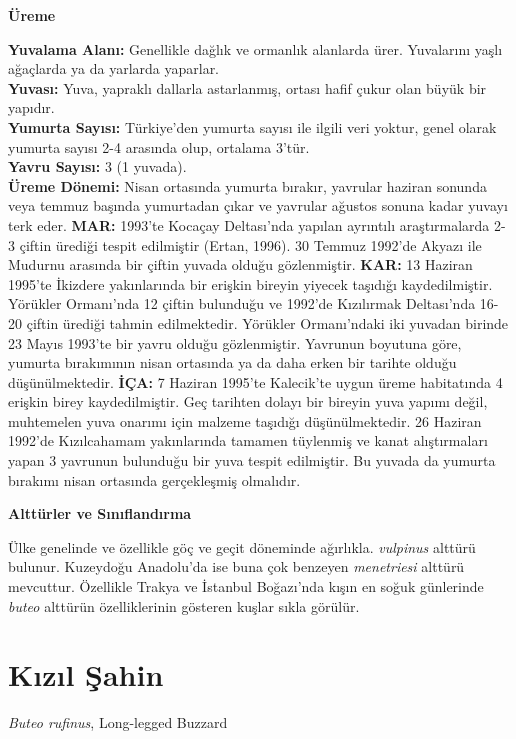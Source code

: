 \documentclass[
  a4paper,
  DIV=11,
  numbers=noendperiod]{scrreprt}
\begin{document}
\textbf{Üreme}

\textbf{Yuvalama Alanı:} Genellikle dağlık ve ormanlık alanlarda ürer.
Yuvalarını yaşlı ağaçlarda ya da yarlarda yaparlar.\\
\textbf{Yuvası:} Yuva, yapraklı dallarla astarlanmış, ortası hafif çukur
olan büyük bir yapıdır.\\
\textbf{Yumurta Sayısı:} Türkiye'den yumurta sayısı ile ilgili veri
yoktur, genel olarak yumurta sayısı 2-4 arasında olup, ortalama 3'tür.\\
\textbf{Yavru Sayısı:} 3 (1 yuvada).\\
\textbf{Üreme Dönemi:} Nisan ortasında yumurta bırakır, yavrular haziran
sonunda veya temmuz başında yumurtadan çıkar ve yavrular ağustos sonuna
kadar yuvayı terk eder. \textbf{MAR:} 1993'te Kocaçay Deltası'nda
yapılan ayrıntılı araştırmalarda 2-3 çiftin ürediği tespit edilmiştir
(Ertan, 1996). 30 Temmuz 1992'de Akyazı ile Mudurnu arasında bir çiftin
yuvada olduğu gözlenmiştir. \textbf{KAR:} 13 Haziran 1995'te İkizdere
yakınlarında bir erişkin bireyin yiyecek taşıdığı kaydedilmiştir.
Yörükler Ormanı'nda 12 çiftin bulunduğu ve 1992'de Kızılırmak
Deltası'nda 16-20 çiftin ürediği tahmin edilmektedir. Yörükler
Ormanı'ndaki iki yuvadan birinde 23 Mayıs 1993'te bir yavru olduğu
gözlenmiştir. Yavrunun boyutuna göre, yumurta bırakımının nisan
ortasında ya da daha erken bir tarihte olduğu düşünülmektedir.
\textbf{İÇA:} 7 Haziran 1995'te Kalecik'te uygun üreme habitatında 4
erişkin birey kaydedilmiştir. Geç tarihten dolayı bir bireyin yuva
yapımı değil, muhtemelen yuva onarımı için malzeme taşıdığı
düşünülmektedir. 26 Haziran 1992'de Kızılcahamam yakınlarında tamamen
tüylenmiş ve kanat alıştırmaları yapan 3 yavrunun bulunduğu bir yuva
tespit edilmiştir. Bu yuvada da yumurta bırakımı nisan ortasında
gerçekleşmiş olmalıdır.

\textbf{Alttürler ve Sınıflandırma}

Ülke genelinde ve özellikle göç ve geçit döneminde ağırlıkla.
\emph{vulpinus} alttürü bulunur. Kuzeydoğu Anadolu'da ise buna çok
benzeyen \emph{menetriesi} alttürü mevcuttur. Özellikle Trakya ve
İstanbul Boğazı'nda kışın en soğuk günlerinde \emph{buteo} alttürün
özelliklerinin gösteren kuşlar sıkla görülür.

\section{Kızıl Şahin}\label{kux131zux131l-ux15fahin}

\emph{Buteo rufinus}, Long-legged Buzzard
\end{document}
